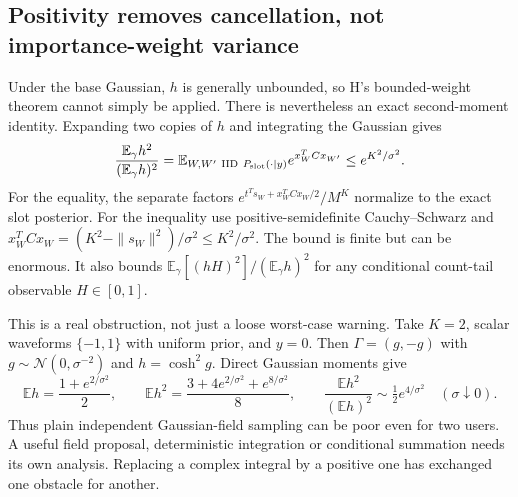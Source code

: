 \documentclass[10pt,a4paper]{article}
\newcommand{\E}{\mathbb E}
\begin{document}
\subsection{Positivity removes cancellation, not importance-weight variance}
Under the base Gaussian, $h$ is generally unbounded, so H's bounded-weight theorem cannot simply be applied.
There is nevertheless an exact second-moment identity. Expanding two copies of $h$ and integrating the
Gaussian gives
\begin{equation}
 \frac{\E_\gamma h^2}{(\E_\gamma h)^2}
 =\E_{W,W'\ {\rm IID}\ P_{\rm slot}(\cdot\mid y)}
       e^{x_W^TCx_{W'}}
 \leq e^{K^2/\sigma^2}.
 \label{eq:field-second-moment}
\end{equation}
For the equality, the separate factors
$e^{t^Ts_W+x_W^TCx_W/2}/M^K$ normalize to the exact slot posterior.
For the inequality use positive-semidefinite Cauchy--Schwarz and
$x_W^TCx_W=(K^2-\|s_W\|^2)/\sigma^2\leq K^2/\sigma^2$.
The bound is finite but can be enormous. It also bounds
$\E_\gamma[(hH)^2]/(\E_\gamma h)^2$ for any conditional count-tail observable $H\in[0,1]$.

This is a real obstruction, not just a loose worst-case warning. Take $K=2$, scalar waveforms $\{-1,1\}$
with uniform prior, and $y=0$. Then $\Gamma=(g,-g)$ with $g\sim\mathcal N(0,\sigma^{-2})$ and
$h=\cosh^2g$. Direct Gaussian moments give
\[
 \E h=\frac{1+e^{2/\sigma^2}}2,\qquad
 \E h^2=\frac{3+4e^{2/\sigma^2}+e^{8/\sigma^2}}8,\qquad
 \frac{\E h^2}{(\E h)^2}\sim\tfrac12 e^{4/\sigma^2}\quad(\sigma\downarrow0).
\]
Thus plain independent Gaussian-field sampling can be poor even for two users. A useful field proposal,
deterministic integration or conditional summation needs its own analysis. Replacing a complex integral
by a positive one has exchanged one obstacle for another.
\end{document}
